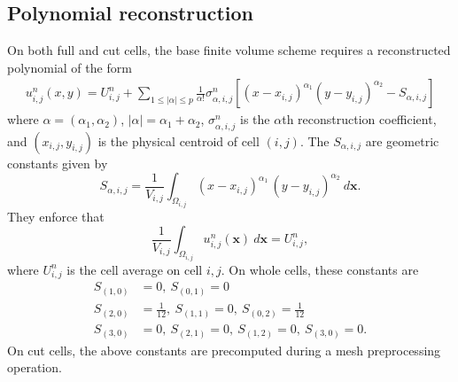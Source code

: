 \subsection{Polynomial reconstruction} \label{sec:ho_reconstruction}
On both full and cut cells, the base finite volume scheme requires a reconstructed polynomial of the form
\begin{equation}\label{eq:uu}
\begin{aligned}
u^n_{i,j} (x,y) = U^n_{i,j} +  \sum_{1 \leq |\alpha| \leq p}  \frac{1}{\alpha!} \sigma^n_{\alpha,i,j} [(x- x_{i,j})^{\alpha_1}(y-y_{i,j})^{\alpha_2}- S_{\alpha,i,j}]
\end{aligned}
\end{equation}
where $\alpha = (\alpha_1, \alpha_2)$, $|\alpha| = \alpha_1 + \alpha_2$, $\sigma^n_{\alpha,i,j}$ is the $\alpha$th reconstruction coefficient, and $ (x_{i,j}, y_{i,j})$ is the physical centroid of cell $(i,j)$. 
The $  S_{\alpha, i,j}$ are geometric constants given by
$$
S_{\alpha, i,j} = \frac{1}{ V_{i,j}}  \int_{\Omega_{i,j}} 
(x-x_{i,j})^{\alpha_1} \, (y-y_{i,j})^{\alpha_2} ~ d\mathbf{x} .
$$
They enforce that 
\begin{equation} \label{eq:uaverage}
\frac{1}{ V_{i,j}}  \int_{\Omega_{i,j}} u^n_{i,j}(\mathbf{x}) ~d\mathbf{x} = U^n_{i,j},
\end{equation}
where  $U^n_{i,j}$ is the cell average on cell $i,j$.  On whole cells, 
these constants are
\begin{equation}
	\begin{aligned}
		S_{(1,0)} &= 0, ~ S_{(0,1)} = 0 \\
		S_{(2,0)} &= \frac{1}{12}, ~ S_{(1,1)} = 0, ~ S_{(0,2)} = \frac{1}{12}\\
		S_{(3,0)} &= 0, ~ S_{(2,1)} = 0, ~ S_{(1,2)} = 0, ~ S_{(3,0)} = 0.
	\end{aligned}
\end{equation}
On cut cells, the above constants are precomputed during a mesh preprocessing operation.

